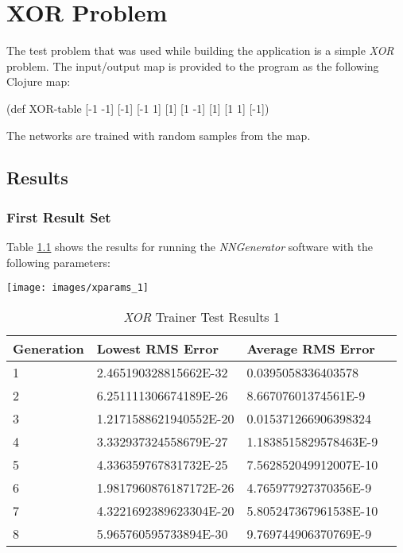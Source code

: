 \chapter[XOR Problem]{XOR Problem}
The test problem that was used while building the application is a
simple {\it XOR} problem. 
The input/output map is provided to the program as the following
Clojure map: 

(def XOR-table {[-1 -1] [-1]
                [-1 1] [1]
                [1 -1] [1]
                [1 1] [-1]})

The networks are trained with random samples from the map.

\section{Results}

\subsection{First Result Set}

Table \ref{xor1} shows the results for running the {\it NNGenerator}
software with the following parameters: 

\begin{center}
\texttt{[image: images/xparams\_1]}
\end{center}

\begin{center}
    \begin{longtable}{ | l | l | l | l |}
      \caption{{\it XOR} Trainer Test Results 1} \label{xor1} \\
    \hline
    Generation & Lowest RMS Error & Average RMS Error \\ \hline
1 &	2.465190328815662E-32 &	0.0395058336403578 \\ \hline
2 &	6.251111306674189E-26 &	8.66707601374561E-9 \\ \hline
3 &	1.2171588621940552E-20 &	0.015371266906398324 \\ \hline
4 &	3.332937324558679E-27 &	1.1838515829578463E-9 \\ \hline
5 &	4.336359767831732E-25 &	7.562852049912007E-10 \\ \hline
6 &	1.9817960876187172E-26 &	4.765977927370356E-9 \\ \hline
7 &	4.3221692389623304E-20 &	5.805247367961538E-10 \\ \hline
8 &	5.965760595733894E-30 &	9.769744906370769E-9 \\ \hline
    \end{longtable}
\end{center}

